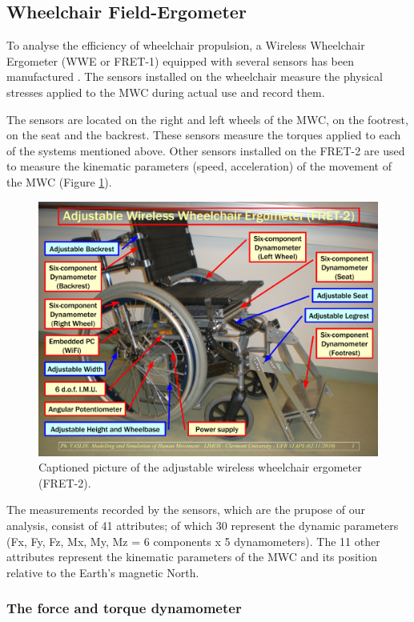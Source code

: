 \subsection{Wheelchair Field-Ergometer}
To analyse the efficiency of wheelchair propulsion, a Wireless Wheelchair Ergometer (WWE or FRET-1)  equipped with several sensors has been manufactured \cite{dabonneville2005self}. The sensors installed on the wheelchair measure the physical stresses applied to the MWC during actual use and record them.


The sensors are located on the right and left wheels of the MWC, on the footrest, on the seat and the backrest. These sensors measure the torques applied to each of the systems mentioned above.  Other sensors installed on the FRET-2 are used to measure the kinematic parameters (speed, acceleration) of the movement of the MWC (Figure \ref{fret_legend}).


\begin{figure}[h]
\center
\includegraphics[scale = 0.4]{images/FRET-2_Legend_GB}
\caption{Captioned picture of the adjustable wireless wheelchair ergometer (FRET-2).}
\label{fret_legend}
\end{figure}


The measurements recorded by the sensors, which are the prupose of our analysis, consist of 41 attributes; of which 30 represent the dynamic parameters (Fx, Fy, Fz, Mx, My, Mz = 6 components x 5 dynamometers). The 11 other attributes represent the kinematic parameters of the MWC and its position relative to the Earth's magnetic North.

\subsubsection{The force and torque dynamometer}

